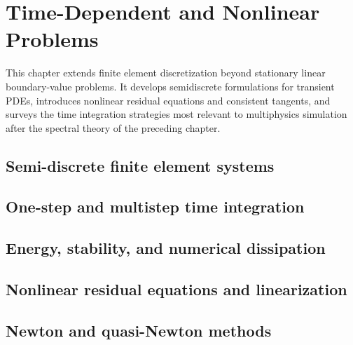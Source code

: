 \chapter{Time-Dependent and Nonlinear Problems}
\label{ch:time_nonlinear}

This chapter extends finite element discretization beyond stationary linear
boundary-value problems. It develops semidiscrete formulations for transient
PDEs, introduces nonlinear residual equations and consistent tangents, and
surveys the time integration strategies most relevant to multiphysics
simulation after the spectral theory of the preceding chapter.

\section{Semi-discrete finite element systems}
\label{sec:time_nonlinear:semidiscrete}


\section{One-step and multistep time integration}
\label{sec:time_nonlinear:time_integrators}


\section{Energy, stability, and numerical dissipation}
\label{sec:time_nonlinear:stability}


\section{Nonlinear residual equations and linearization}
\label{sec:time_nonlinear:linearization}


\section{Newton and quasi-Newton methods}
\label{sec:time_nonlinear:newton}

